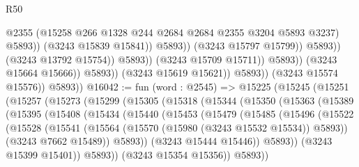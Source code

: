 \begin{lexlean}{R50}
\begin{coremodule}
                                                  @2355
                                                  (@15258
                                                    @266
                                                    @1328
                                                    @244
                                                    @2684
                                                    @2684
                                                    @2355
                                                    @3204
                                                    @5893
                                                    @3237)
                                                  @5893))
                                              (@3243 @15839 @15841))
                                            @5893))
                                        (@3243 @15797 @15799))
                                      @5893))
                                  (@3243 @13792 @15754))
                                @5893))
                            (@3243 @15709 @15711))
                          @5893))
                      (@3243 @15664 @15666))
                    @5893))
                (@3243 @15619 @15621))
              @5893))
          (@3243 @15574 @15576))
        @5893))
@16042 := fun (word : @2545) =>
  @15225
    (@15245
      (@15251
        (@15257
          (@15273
            (@15299
              (@15305
                (@15318
                  (@15344
                    (@15350
                      (@15363
                        (@15389
                          (@15395
                            (@15408
                              (@15434
                                (@15440
                                  (@15453
                                    (@15479
                                      (@15485
                                        (@15496
                                          (@15522
                                            (@15528
                                              (@15541
                                                (@15564
                                                  (@15570 (@15980 (@3243 @15532 @15534)) @5893))
                                                (@3243 @7662 @15489))
                                              @5893))
                                          (@3243 @15444 @15446))
                                        @5893))
                                    (@3243 @15399 @15401))
                                  @5893))
                              (@3243 @15354 @15356))
                            @5893))

\end{coremodule}
\end{lexlean}
